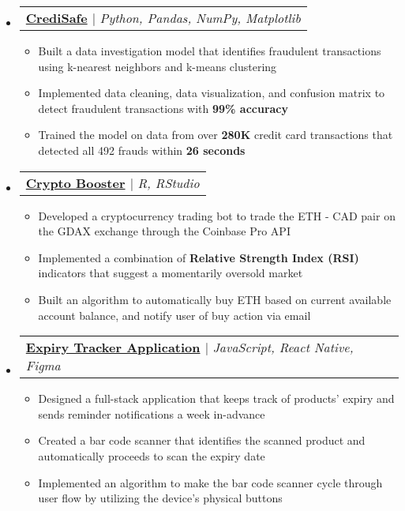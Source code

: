 \documentclass[letterpaper,11pt]{article}
\newcommand{\resumeItem}[1]{
  \setlength{\itemindent}{-1.2em}
  \item{
    {\small#1 \vspace{-2pt}}
  }
}
\newcommand{\resumeProjectHeading}[2]{
  \item
  \begin{tabular*}{1.001\textwidth}{l}
  \textbf{\small#1} $|$ \textsl{\textcolor{myBlue}{\small #2}} \\
  \end{tabular*}\vspace{-7pt}
}
\newcommand{\resumeSubHeadingListStart}{
  \begin{itemize}[leftmargin=0.0in, label={}]
}
\newcommand{\resumeSubHeadingListEnd}{
  \end{itemize}
}
\newcommand{\resumeItemListStart}{
  \begin{itemize}
}
\newcommand{\resumeItemListEnd}{
  \end{itemize}\vspace{-5pt}
}
\begin{document}
\vspace{-2pt}
\resumeSubHeadingListStart
  \resumeProjectHeading
  {{\href{https://github.com/rohanxminocha/credisafe}{CrediSafe}}
  {\href{https://github.com/rohanxminocha/credisafe}{\faGithub}}}{Python, Pandas, NumPy, Matplotlib}
  \resumeItemListStart
    \vspace{-14pt}
    \resumeItem{Built a data investigation model that identifies fraudulent transactions using k-nearest neighbors and k-means clustering}
    \resumeItem{Implemented data cleaning, data visualization, and confusion matrix to detect fraudulent transactions with \textbf{\textcolor{myBlue}{99\% accuracy}}}
    \resumeItem{Trained the model on data from over \textbf{\textcolor{myBlue}{280K}} credit card transactions that detected all 492 frauds within \textbf{\textcolor{myBlue}{26 seconds}}}
    \resumeItemListEnd
  \vspace{-18pt}

  \resumeProjectHeading
  {\textbf{\href{https://github.com/rohanxminocha/crypto-booster}{Crypto Booster}}
  {\href{https://github.com/rohanxminocha/crypto-booster}{\faGithub}}}{R, RStudio}
  \resumeItemListStart
    \vspace{-14pt}
    \resumeItem{Developed a cryptocurrency trading bot to trade the ETH - CAD pair on the GDAX exchange through the Coinbase Pro API}
    \resumeItem{Implemented a combination of \textbf{\textcolor{myBlue}{Relative Strength Index (RSI)}} indicators that suggest a momentarily oversold market}
    \resumeItem{Built an algorithm to automatically buy ETH based on current available account balance, and notify user of buy action via email}
    \resumeItemListEnd 
  \vspace{-18pt}

  \resumeProjectHeading
  {\textbf{\href{https://github.com/rohanxminocha/ExpiryTracker-yuHacks2021}{Expiry Tracker Application}}
  {\href{https://github.com/rohanxminocha/ExpiryTracker-yuHacks2021}{\faGithub}}}{JavaScript, React Native, Figma}
  \resumeItemListStart
    \vspace{-14pt}
    \resumeItem{Designed a full-stack application that keeps track of products' expiry and sends reminder notifications a week in-advance}
    \resumeItem{Created a bar code scanner that identifies the scanned product and automatically proceeds to scan the expiry date}
    \resumeItem{Implemented an algorithm to make the  bar code scanner cycle through user flow by utilizing the device's physical buttons}
  \resumeItemListEnd
\resumeSubHeadingListEnd
\vspace{-15pt} 
\end{document}
